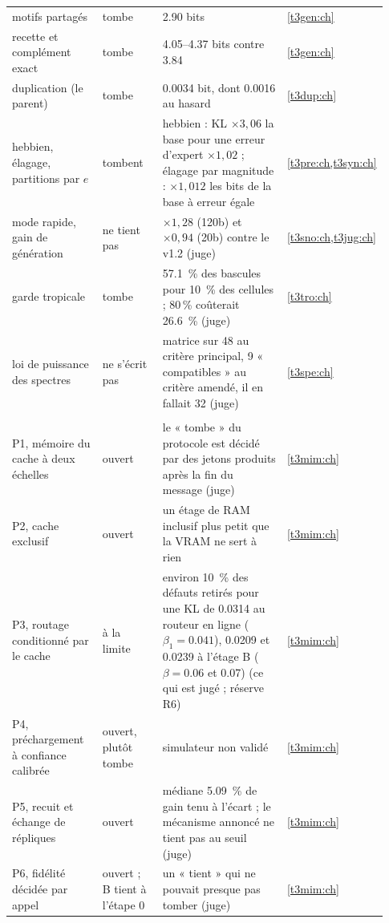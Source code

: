 \begin{longtable}{@{}>{\raggedright\arraybackslash}p{0.25\linewidth}>{\raggedright\arraybackslash}p{0.17\linewidth}>{\raggedright\arraybackslash}p{0.40\linewidth}>{\raggedright\arraybackslash}p{0.11\linewidth}@{}}
motifs partagés & tombe & \num{2.90} bits & \cref{t3gen:ch} \\
recette et complément exact & tombe & \numrange{4.05}{4.37} bits contre \num{3.84} & \cref{t3gen:ch} \\
duplication (le parent) & tombe & \num{0.0034} bit, dont \num{0.0016} au hasard & \cref{t3dup:ch} \\
hebbien, élagage, partitions par $e$ & tombent & hebbien : KL $\times 3{,}06$ la base pour une erreur d'expert $\times 1{,}02$ ; élagage par magnitude : $\times 1{,}012$ les bits de la base à erreur égale & \cref{t3pre:ch,t3syn:ch} \\
mode rapide, gain de génération & ne tient pas & $\times 1{,}28$ (120b) et $\times 0{,}94$ (20b) contre le v1.2 (juge) & \cref{t3sno:ch,t3jug:ch} \\
garde tropicale & tombe & \SI{57.1}{\percent} des bascules pour \SI{10}{\percent} des cellules ; 80\,\% coûterait \SI{26.6}{\percent} (juge) & \cref{t3tro:ch} \\
loi de puissance des spectres & ne s'écrit pas & 0 matrice sur 48 au critère principal, 9 « compatibles » au critère amendé, il en fallait 32 (juge) & \cref{t3spe:ch} \\
\multicolumn{4}{@{}l}{\textsf{\bfseries Ouverts}} \\
P1, mémoire du cache à deux échelles & ouvert & le « tombe » du protocole est décidé par des jetons produits après la fin du message (juge) & \cref{t3mim:ch} \\
P2, cache exclusif & ouvert & un étage de RAM inclusif plus petit que la VRAM ne sert à rien & \cref{t3mim:ch} \\
P3, routage conditionné par le cache & à la limite & environ \SI{10}{\percent} des défauts retirés pour une KL de \num{0.0314} au routeur en ligne ($\beta_1 = \num{0.041}$), \num{0.0209} et \num{0.0239} à l'étage B ($\beta = \num{0.06}$ et \num{0.07}) (ce qui est jugé ; réserve R6) & \cref{t3mim:ch} \\
P4, préchargement à confiance calibrée & ouvert, plutôt tombe & simulateur non validé & \cref{t3mim:ch} \\
P5, recuit et échange de répliques & ouvert & médiane \SI{5.09}{\percent} de gain tenu à l'écart ; le mécanisme annoncé ne tient pas au seuil (juge) & \cref{t3mim:ch} \\
P6, fidélité décidée par appel & ouvert ; B tient à l'étape 0 & un « tient » qui ne pouvait presque pas tomber (juge) & \cref{t3mim:ch} \\
\bottomrule
\end{longtable}
\endgroup

